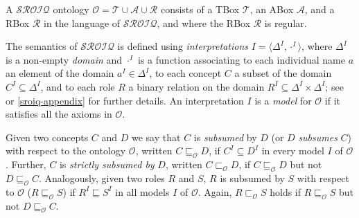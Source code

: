 \begin{definition}
    A $\mathcal{SROIQ}$  ontology $\mathcal{O} = \mathcal{T} \cup \mathcal{A} \cup \mathcal{R}$ consists of a TBox $\mathcal{T}$, an ABox $\mathcal{A}$, and a RBox $\mathcal{R}$ in the language of $\mathcal{SROIQ}$, and where the RBox $\mathcal{R}$ is regular.
\end{definition}

The semantics of $\mathcal{SROIQ}$ is  defined using \emph{interpretations} $I = \langle \Delta^I, \cdot^I \rangle$, where $\Delta^I$ is a non-empty \emph{domain} and $\cdot^I$ is a function associating to each individual name $a$ an element of the domain $a^I \in \Delta^I$, to each concept $C$ a subset of the domain $C^I \subseteq \Delta^I$, and to each role $R$ a binary relation on the domain $R^I \subseteq \Delta^I \times \Delta^I$; see \cite{baader_horrocks_lutz_sattler_2017,horrocks2006even} or \cref{sroiq-appendix} for further details. An interpretation $I$ is a \emph{model} for $\mathcal{O}$ if it satisfies all the axioms in $\mathcal{O}$.

Given two concepts $C$ and $D$ we say that $C$ is \emph{subsumed} by $D$ (or $D$ \emph{subsumes} $C$) with respect to the ontology $\mathcal{O}$, written $C \sqsubseteq_\mathcal{O} D$, if $C^I \subseteq D^I$ in every model $I$ of $\mathcal{O}$. Further, $C$ is \emph{strictly subsumed by} $D$, written $C \sqsubset_\mathcal{O} D$, if $C \sqsubseteq_\mathcal{O} D$ but not $D \sqsubseteq_\mathcal{O} C$. Analogously, given two roles $R$ and $S$, $R$ is subsumed by $S$ with respect to $\mathcal{O}$ ($R \sqsubseteq_\mathcal{O} S$) if $R^I \sqsubseteq S^I$ in all models $I$ of $\mathcal{O}$. Again, $R \sqsubset_\mathcal{O} S$ holds if $R \sqsubseteq_\mathcal{O} S$ but not $D \sqsubseteq_\mathcal{O} C$.
